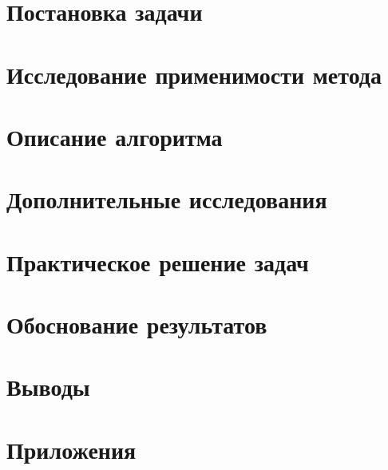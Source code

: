 \documentclass[main.tex]{subfiles}
\begin{document}
\section{Постановка задачи}

\section{Исследование применимости метода}

\section{Описание алгоритма}

\section{Дополнительные исследования}

\section{Практическое решение задач}

\section{Обоснование результатов}

\section{Выводы}

\section{Приложения}

\end{document}
